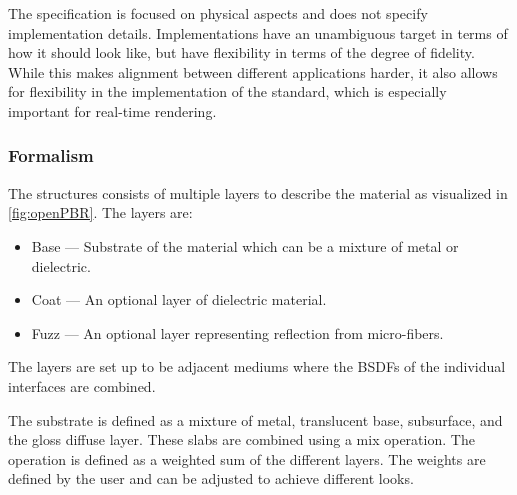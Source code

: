 The specification is focused on physical aspects and does not specify implementation details. Implementations have an unambiguous target in terms of how it should look like, but have flexibility in terms of the degree of fidelity. While this makes alignment between different applications harder, it also allows for flexibility in the implementation of the standard, which is especially important for real-time rendering.

\subsubsection{Formalism}

The structures consists of multiple layers to describe the material as visualized in \autoref{fig:openPBR}. The layers are:

\begin{itemize}
  \item{Base} — Substrate of the material which can be a mixture of metal or dielectric.
  \item{Coat} — An optional layer of dielectric material.
  \item{Fuzz} — An optional layer representing reflection from micro-fibers.
\end{itemize}

The layers are set up to be adjacent mediums where the \glspl{BSDF} of the individual interfaces are combined.

The substrate is defined as a mixture of metal, translucent base, subsurface, and the gloss diffuse layer. These slabs are combined using a mix operation. The operation is defined as a weighted sum of the different layers. The weights are defined by the user and can be adjusted to achieve different looks.

